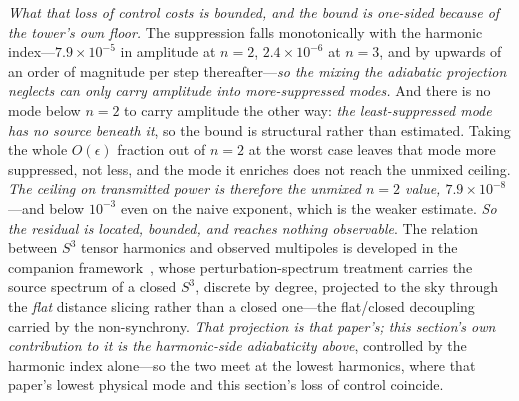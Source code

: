 \documentclass[11pt,a4paper]{article}
\theoremstyle{plain}
\theoremstyle{definition}
\theoremstyle{remark}
\begin{document}
\emph{What that loss of control costs is bounded, and the bound is one-sided because of the tower's own
floor.} The suppression falls monotonically with the harmonic index---$7.9\times10^{-5}$ in amplitude at
$n=2$, $2.4\times10^{-6}$ at $n=3$, and by upwards of an order of magnitude per step
thereafter---\emph{so the mixing the adiabatic projection neglects can only carry amplitude into
more-suppressed modes.} And there is no mode below $n=2$ to carry amplitude the other way: \emph{the
least-suppressed mode has no source beneath it}, so the bound is structural rather than estimated. Taking
the whole $O(\epsilon)$ fraction out of $n=2$ at the worst case leaves that mode more suppressed, not less,
and the mode it enriches does not reach the unmixed ceiling. \emph{The ceiling on transmitted power is
therefore the unmixed $n=2$ value, $7.9\times10^{-8}$}---and below $10^{-3}$ even on the naive exponent,
which is the weaker estimate. \emph{So the residual is located, bounded, and reaches nothing
observable}. The relation between $S^{3}$ tensor harmonics and observed
multipoles is developed in the companion framework~\cite{JanzenCRframework}, whose perturbation-spectrum
treatment carries the source spectrum of a closed $S^{3}$, discrete by degree, projected to the sky
through the \emph{flat} distance slicing rather than a closed one---the flat/closed decoupling carried
by the non-synchrony. \emph{That projection is that paper's; this section's own contribution to it is
the harmonic-side adiabaticity above}, controlled by the harmonic index alone---so the two meet at the
lowest harmonics, where that paper's lowest physical mode and this section's loss of control coincide.
\end{document}
